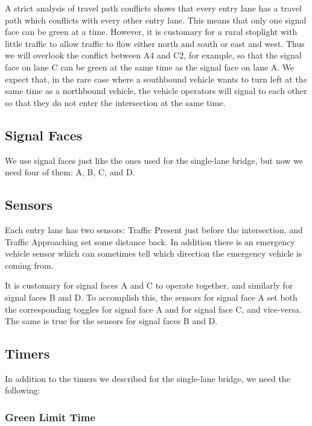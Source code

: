 \documentclass[letterpaper,twoside]{article}
\begin{document}
A strict analysis of travel path conflicts shows that every entry lane
has a travel path which conflicts with every other entry lane.  This means
that only one signal face can be green at a time.
However, it is customary for a rural stoplight with little traffic to allow
traffic to flow either north and south or east and west.  
Thus we will overlook the conflict between A4 and C2, for example, so
that the signal face on lane C can be green at the same time as the
signal face on lane A.  We expect that, in the rare case where a southbound
vehicle wants to turn left at the same time as a northbound vehicle,
the vehicle operators will signal to each other so that they do not
enter the intersection at the same time.

\subsection{Signal Faces}

We use signal faces just like the ones used for the single-lane
bridge, but now we need four of them: A, B, C, and D.

\subsection{Sensors}

Each entry lane has two sensors: Traffic Present just before the intersection,
and Traffic Approaching set some distance back.  In addition there is an
emergency vehicle sensor which can sometimes tell which direction
the emergency vehicle is coming from.

It is customary for signal faces A and C to operate together,
and similarly for signal faces B and D.  To accomplish this, the sensors for
signal face A set both the corresponding toggles for signal face A
and for signal face C, and vice-versa.  The same is true for the sensors
for signal faces B and D.

\subsection{Timers}

In addition to the timers we described for the single-lane bridge,
we need the following:

\subsubsection{Green Limit Time}
\end{document}
